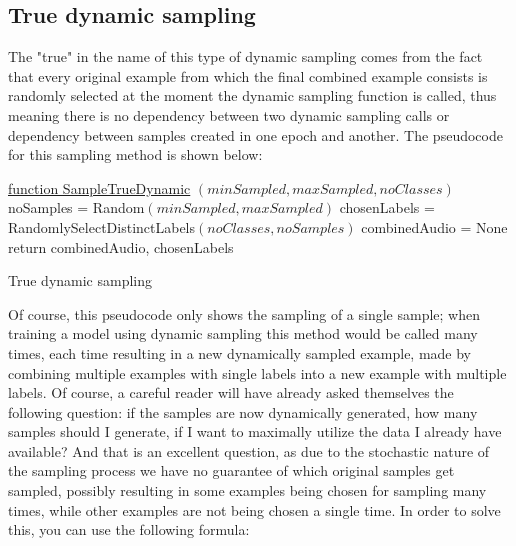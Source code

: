 \subsection{True dynamic sampling}

The "true" in the name of this type of dynamic sampling comes from the fact that every original example from which the final combined example consists is randomly selected at the moment the dynamic sampling function is called, thus meaning there is no dependency between two dynamic sampling calls or dependency between samples created in one epoch and another. The pseudocode for this sampling method is shown below:

\begin{algorithm}[H]

    \underline{function SampleTrueDynamic} $(minSampled, maxSampled, noClasses)$\;
    noSamples = Random$(minSampled, maxSampled)$\;
    chosenLabels = RandomlySelectDistinctLabels$(noClasses, noSamples)$\;
    combinedAudio = None\;
    return combinedAudio, chosenLabels \;
    \caption{True dynamic sampling}
\end{algorithm}

Of course, this pseudocode only shows the sampling of a single sample; when training a model using dynamic sampling this method would be called many times, each time resulting in a new dynamically sampled example, made by combining multiple examples with single labels into a new example with multiple labels. Of course, a careful reader will have already asked themselves the following question: if the samples are now dynamically generated, how many samples should I generate, if I want to maximally utilize the data I already have available? And that is an excellent question, as due to the stochastic nature of the sampling process we have no guarantee of which original samples get sampled, possibly resulting in some examples being chosen for sampling many times, while other examples are not being chosen a single time. In order to solve this, you can use the following formula:

